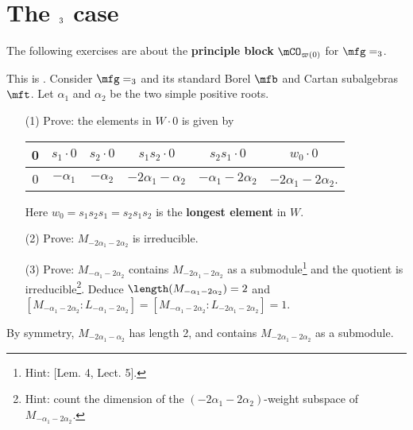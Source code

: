 \section{The \texorpdfstring{$\sl_3$}{sl3} case}

	The following exercises are about the \textbf{principle block} $\mCO_{\varpi(0)}$ for $\mfg=\sl_3$.

	\begin{exe}
		\label{exe-H3P2}
		This is . Consider $\mfg = \sl_3$ and its standard Borel $\mfb$ and Cartan subalgebras $\mft$. Let $\alpha_1$ and $\alpha_2$ be the two simple positive roots.
		\begin{itemize}
			\item[(1)]
				Prove: the elements in $W\cdot 0$ is given by
				\begin{center}
					\begin{tabular}{|c |c| c| c| c| c|}
					\hline 
					0 & $s_1\cdot 0$ & $s_2\cdot 0$ & $s_1s_2 \cdot 0$ & $s_2 s_1 \cdot 0$ & $w_0 \cdot 0$ \\
				\hline
						0 & $-\alpha_1$ & $-\alpha_2$ & $-2\alpha_1-\alpha_2$ & $-\alpha_1-2\alpha_2$ & $-2\alpha_1-2\alpha_2$. \\
			\hline
				\end{tabular}
			\end{center}
			Here $w_0 = s_1 s_2 s_1 = s_2 s_1 s_2$ is the \textbf{longest element} in $W$.
			\item[(2)]
				Prove: $M_{-2\alpha_1-2\alpha_2}$ is irreducible.
			\item[(3)]
				Prove: $M_{-\alpha_1-2\alpha_2}$ contains $M_{-2\alpha_1-2\alpha_2}$ as a submodule\footnote{Hint: [Lem. 4, Lect. 5].} and the quotient is irreducible\footnote{Hint: count the dimension of the $(-2\alpha_1-2\alpha_2)$-weight subspace of $M_{-\alpha_1-2\alpha_2}$.}. Deduce $\length(M_{-\alpha_1-2\alpha_2})=2$ and $[M_{-\alpha_1-2\alpha_2}: L_{-\alpha_1-2\alpha_2}] = [M_{-\alpha_1-2\alpha_2}: L_{-2\alpha_1-2\alpha_2}] = 1$.
		\end{itemize}
	\end{exe}

	\begin{rem}
		By symmetry, $M_{-2\alpha_1-\alpha_2}$ has length 2, and contains $M_{-2\alpha_1-2\alpha_2}$ as a submodule.
	\end{rem}

